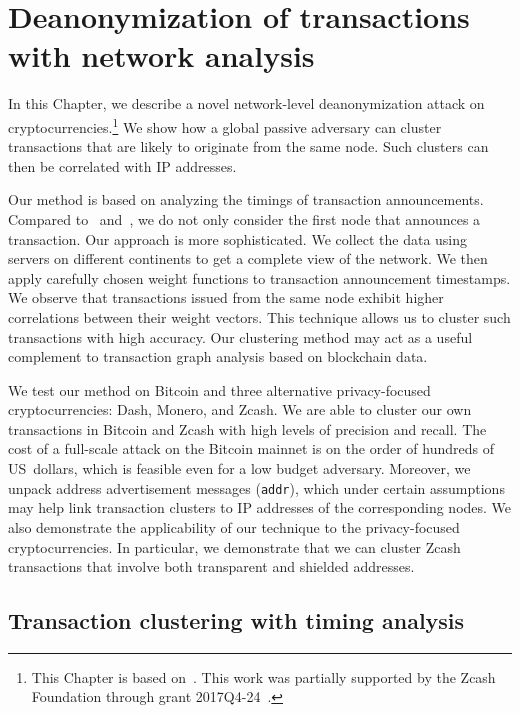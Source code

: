 \chapter{Deanonymization of transactions with network analysis} %

\label{Chapter03Clustering}

In this Chapter, we describe a novel network-level deanonymization attack on cryptocurrencies.\footnote{This Chapter is based on~\cite{Biryukov2019a, Biryukov2019b}. This work was partially supported by the Zcash Foundation through grant 2017Q4-24~\cite{Feher2017}.}
We show how a global passive adversary can cluster transactions that are likely to originate from the same node.
Such clusters can then be correlated with IP addresses.

Our method is based on analyzing the timings of transaction announcements.
Compared to~\cite{Biryukov2014} and~\cite{Koshy2014}, we do not only consider the first node that announces a transaction.
Our approach is more sophisticated.
We collect the data using servers on different continents to get a complete view of the network.
We then apply carefully chosen weight functions to transaction announcement timestamps.
We observe that transactions issued from the same node exhibit higher correlations between their weight vectors.
This technique allows us to cluster such transactions with high accuracy.
Our clustering method may act as a useful complement to transaction graph analysis based on blockchain data.

We test our method on Bitcoin and three alternative privacy-focused cryptocurrencies: Dash, Monero, and Zcash.
We are able to cluster our own transactions in Bitcoin and Zcash with high levels of precision and recall.
The cost of a full-scale attack on the Bitcoin mainnet is on the order of hundreds of US~dollars, which is feasible even for a low budget adversary.
Moreover, we unpack address advertisement messages (\texttt{addr}), which under certain assumptions may help link transaction clusters to IP addresses of the corresponding nodes.
We also demonstrate the applicability of our technique to the privacy-focused cryptocurrencies.
In particular, we demonstrate that we can cluster Zcash transactions that involve both transparent and shielded addresses.


\section{Transaction clustering with timing analysis}  \label{sec:Ch03Ourapproach}

